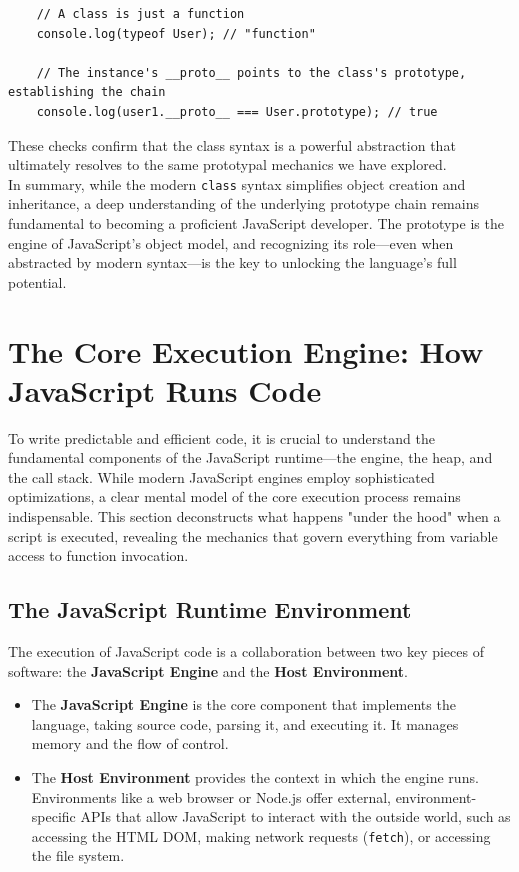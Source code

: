 \documentclass{scrbook}
\begin{document}
\begin{lstlisting}
    // A class is just a function
    console.log(typeof User); // "function"
    
    // The instance's __proto__ points to the class's prototype, establishing the chain
    console.log(user1.__proto__ === User.prototype); // true
\end{lstlisting}

These checks confirm that the class syntax is a powerful abstraction that ultimately resolves to the same prototypal mechanics we have explored. \\

In summary, while the modern \texttt{class} syntax simplifies object creation and inheritance, a deep understanding of the underlying prototype chain remains fundamental to becoming a proficient JavaScript developer. The prototype is the engine of JavaScript's object model, and recognizing its role—even when abstracted by modern syntax—is the key to unlocking the language's full potential.

\chapter{The Core Execution Engine: How JavaScript Runs Code}

To write predictable and efficient code, it is crucial to understand the fundamental components of the JavaScript runtime—the engine, the heap, and the call stack. While modern JavaScript engines employ sophisticated optimizations, a clear mental model of the core execution process remains indispensable. This section deconstructs what happens "under the hood" when a script is executed, revealing the mechanics that govern everything from variable access to function invocation.

\section{The JavaScript Runtime Environment}

The execution of JavaScript code is a collaboration between two key pieces of software: the \textbf{JavaScript Engine} and the \textbf{Host Environment}.

\begin{itemize}
    \item
    The \textbf{JavaScript Engine} is the core component that implements the language, taking source code, parsing it, and executing it. It manages memory and the flow of control.
    
    \item
    The \textbf{Host Environment} provides the context in which the engine runs. Environments like a web browser or Node.js offer external, environment-specific APIs that allow JavaScript to interact with the outside world, such as accessing the HTML DOM, making network requests (\texttt{fetch}), or accessing the file system.
\end{itemize}
\end{document}
